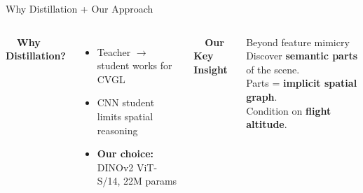 \documentclass[aspectratio=169, 11pt]{beamer}
\begin{document}
\begin{frame}{Why Distillation + Our Approach}
\begin{columns}[T]
\vspace{0.2cm}
{\large \textbf{\faGraduationCap\ \ Why Distillation?}}
\vspace{0.2cm}
\begin{itemize}
  \setlength\itemsep{0.6em}
  \item Teacher $\rightarrow$ student works for CVGL
  \item CNN student limits spatial reasoning
  \item \textbf{Our choice:} DINOv2 ViT-S/14, 22M params
\end{itemize}

\vspace{0.2cm}
{\large \textbf{\faLightbulb\ \ Our Key Insight}}
\vspace{0.2cm}

\begin{exampleblock}{Beyond feature mimicry}
  Discover \textbf{semantic parts} of the scene.\\[0.2em]
  Parts = \textbf{implicit spatial graph}.\\[0.2em]
  Condition on \textbf{flight altitude}.
\end{exampleblock}
\end{columns}
\end{frame}
\end{document}
